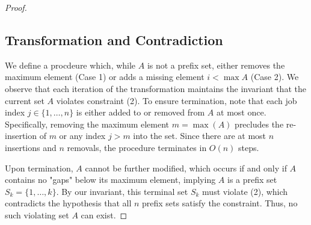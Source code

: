 \begin{proof}
\subsection*{Transformation and Contradiction}
We define a procdeure which, while $A$ is not a prefix set, either removes the maximum element (Case 1) or adds a missing element $i < \max A$ (Case 2). 
We observe that each iteration of the transformation maintains the invariant that the current set $A$ violates constraint (2). To ensure termination, note that each job index $j \in \{1, \dots, n\}$ is either added to or removed from $A$ at most once. Specifically, removing the maximum element $m = \max(A)$ precludes the re-insertion of $m$ or any index $j > m$ into the set. Since there are at most $n$ insertions and $n$ removals, the procedure terminates in $O(n)$ steps. 


Upon termination, $A$ cannot be further modified, which occurs if and only if $A$ contains no "gaps" below its maximum element, implying $A$ is a prefix set $S_k = \{1, \dots, k\}$. By our invariant, this terminal set $S_k$ must violate (2), which contradicts the hypothesis that all $n$ prefix sets satisfy the constraint. Thus, no such violating set $A$ can exist.

\end{proof}
\newpage
